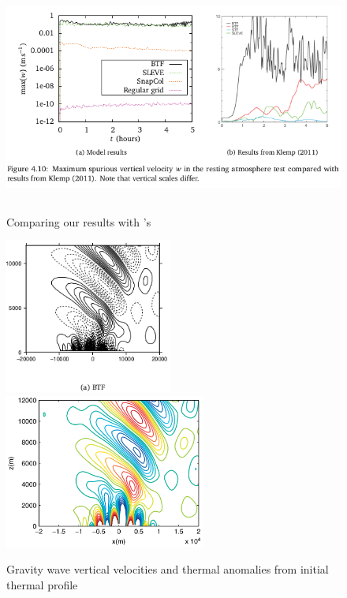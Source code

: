\documentclass[a4paper]{article}
\begin{document}
\begin{figure}
	\includegraphics[height=3in]{resting-atmosphere-w.png}
%
	\caption{Comparing our results with \textcite{klemp2011}'s}
	\label{fig:resting}
\end{figure}

\begin{figure}
	\includegraphics[height=2in]{gw-w-btf.png}
	\includegraphics[height=2in]{melvin-7a.png}
%
	\caption{Gravity wave vertical velocities and thermal anomalies from initial thermal profile}
	\label{fig:gw-w}
\end{figure}
\end{document}
